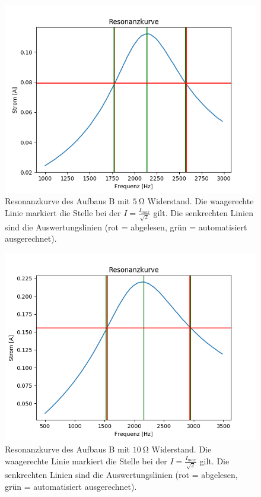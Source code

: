 \documentclass[12pt,a4paper]{article}
\begin{document}
\begin{figure}[H]
	\centering
	\includegraphics[scale=0.7]{Bilder/Serie_Resonanzkurve_B_5.png}
	\caption{Resonanzkurve des Aufbaus B mit $\SI{5}{\ohm}$ Widerstand. Die waagerechte Linie markiert die Stelle bei der $I = \frac{I_{max}}{\sqrt{2}}$ gilt. Die senkrechten Linien sind die Auswertungslinien (rot = abgelesen, grün = automatisiert ausgerechnet).}
	\label{fig:Serie_Resonanzkurve_B_5}
\end{figure}
\begin{figure}[H]
	\centering
	\includegraphics[scale=0.7]{Bilder/Serie_Resonanzkurve_B_10.png}
	\caption{Resonanzkurve des Aufbaus B mit $\SI{10}{\ohm}$ Widerstand. Die waagerechte Linie markiert die Stelle bei der $I = \frac{I_{max}}{\sqrt{2}}$ gilt. Die senkrechten Linien sind die Auswertungslinien (rot = abgelesen, grün = automatisiert ausgerechnet).}
	\label{fig:Serie_Resonanzkurve_B_10}
\end{figure}
\end{document}
